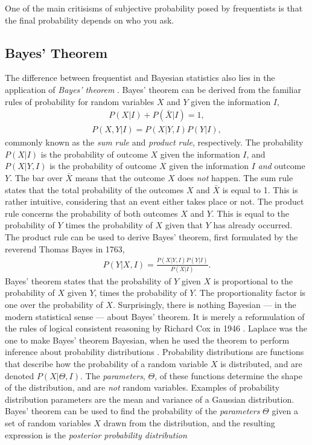 \documentclass[twoside,english]{uiofysmaster}
\begin{document}
{{One of the main critisisms of subjective probability posed by frequentists is that the final probability depends on who you ask.

\subsection{Bayes' Theorem}

The difference between frequentist and Bayesian statistics also lies in the application of \textit{Bayes' theorem} \cite{mr1763essay}. Bayes' theorem can be derived from the familiar rules of probability for random variables $X$ and $Y$ given the information $I$,
\begin{align}\label{Eq:: gaussian process : Sum rule}
P(X | I) + P(\bar{X} | I) = 1,
\end{align}
\begin{align}
 \label{Eq:: gaussian process : Product rule}
P(X, Y | I) = P(X | Y, I)  P(Y | I),
\end{align} 
commonly known as the \textit{sum rule} and \textit{product rule}, respectively. The probability $P(X|I)$ is the probability of outcome $X$ given the information $I$, and $P(X|Y,I)$ is the probability of outcome $X$ given the information $I$ \textit{and} outcome $Y$. The bar over $\bar{X}$ means that the outcome $X$ does \textit{not} happen. The sum rule states that the total probability of the outcomes $X$ and $\bar{X}$ is equal to 1. This is rather intuitive, considering that an event either takes place or not. The product rule concerns the probability of both outcomes $X$ and $Y$. This is equal to the probability of $Y$ times the probability of $X$ given that $Y$ has already occurred. The product rule can be used to derive Bayes' theorem, first formulated by the reverend Thomas Bayes in 1763,
\begin{align}\label{Eq:: gaussian process : Bayes theorem}
P(Y | X, I) = \frac{P(X | Y, I)  P(Y | I)}{P(X | I)}.
\end{align}
Bayes' theorem states that the probability of $Y$ given $X$ is proportional to the probability of $X$ given $Y$, times the probability of $Y$. The proportionality factor is one over the probability of $X$. Surprisingly, there is nothing Bayesian --- in the modern statistical sense ---  about Bayes' theorem. It is merely a reformulation of the rules of logical consistent reasoning by Richard Cox in 1946 \cite{sivia2006data}. Laplace was the one to make Bayes' theorem Bayesian, when he used the theorem to perform inference about probability distributions \cite{laplace1820theorie}. Probability distributions are functions that describe how the probability of a random variable $X$ is distributed, and are denoted $P(X| \Theta, I)$. The \textit{parameters}, $\Theta$, of these functions determine the shape of the distribution, and are \textit{not} random variables. Examples of probability distribution parameters are the mean and variance of a Gaussian distribution. Bayes' theorem can be used to find the probability of the \textit{parameters} $\Theta$ given a set of random variables  $X$ drawn from the distribution, and the resulting expression is the \textit{posterior probability distribution}
}}
\end{document}
